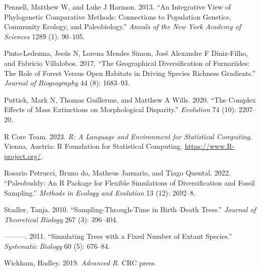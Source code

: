 \documentclass[
]{article}
\newlength{\cslhangindent}
\newenvironment{cslreferences}%
  {\setlength{\parindent}{0pt}%
  \everypar{\setlength{\hangindent}{\cslhangindent}}\ignorespaces}%
  {\par}
\begin{document}
\begin{cslreferences}
\leavevmode\hypertarget{ref-pennell2013review}{}%
Pennell, Matthew W, and Luke J Harmon. 2013. ``An Integrative View of
Phylogenetic Comparative Methods: Connections to Population Genetics,
Community Ecology, and Paleobiology.'' \emph{Annals of the New York
Academy of Sciences} 1289 (1): 90--105.

\leavevmode\hypertarget{ref-pinto2017geographical}{}%
Pinto-Ledezma, Jesús N, Lorena Mendes Simon, José Alexandre F
Diniz-Filho, and Fabricio Villalobos. 2017. ``The Geographical
Diversification of Furnariides: The Role of Forest Versus Open Habitats
in Driving Species Richness Gradients.'' \emph{Journal of Biogeography}
44 (8): 1683--93.

\leavevmode\hypertarget{ref-puttick2020complex}{}%
Puttick, Mark N, Thomas Guillerme, and Matthew A Wills. 2020. ``The
Complex Effects of Mass Extinctions on Morphological Disparity.''
\emph{Evolution} 74 (10): 2207--20.

\leavevmode\hypertarget{ref-R}{}%
R Core Team. 2023. \emph{R: A Language and Environment for Statistical
Computing}. Vienna, Austria: R Foundation for Statistical Computing.
\url{https://www.R-project.org/}.

\leavevmode\hypertarget{ref-paleobuddy}{}%
Rosario Petrucci, Bruno do, Matheus Januario, and Tiago Quental. 2022.
``Paleobuddy: An R Package for Flexible Simulations of Diversification
and Fossil Sampling.'' \emph{Methods in Ecology and Evolution} 13 (12):
2692--8.

\leavevmode\hypertarget{ref-stadler2010birthdeath}{}%
Stadler, Tanja. 2010. ``Sampling-Through-Time in Birth--Death Trees.''
\emph{Journal of Theoretical Biology} 267 (3): 396--404.

\leavevmode\hypertarget{ref-treesim}{}%
---------. 2011. ``Simulating Trees with a Fixed Number of Extant
Species.'' \emph{Systematic Biology} 60 (5): 676--84.

\leavevmode\hypertarget{ref-wickham2019advanced}{}%
Wickham, Hadley. 2019. \emph{Advanced R}. CRC press.
\end{cslreferences}
\end{document}
